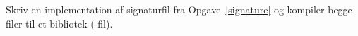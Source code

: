 \label{implementation}Skriv en implementation af signaturfil fra Opgave~\ref{signature} og kompiler begge filer til et bibliotek (-fil).
